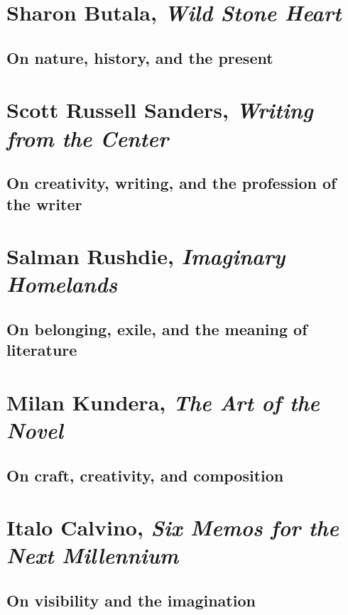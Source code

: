 \documentclass[letterpaper,oneside]{memoir}
\begin{document}
\begin{description}
\section{Sharon Butala, \textit{Wild Stone Heart}}
\subsection{On nature, history, and the present}
\newpage
\addtocounter{page}{+10}
\vspace*{5cm}
\section{Scott Russell Sanders, \textit{Writing from the Center}}
\subsection{On creativity, writing, and the profession of the writer}
\newpage
\addtocounter{page}{+19}
\vspace*{5cm}
\section{Salman Rushdie, \textit{Imaginary Homelands}}
\subsection{On belonging, exile, and the meaning of literature}
\newpage
\addtocounter{page}{+3}
\vspace*{5cm}
\section{Milan Kundera, \textit{The Art of the Novel}}
\subsection{On craft, creativity, and composition}

\newpage
\addtocounter{page}{+13}
\vspace*{5cm}
\section{Italo Calvino, \textit{Six Memos for the Next Millennium}}
\subsection{On visibility and the imagination}


\end{description}
\end{document}
